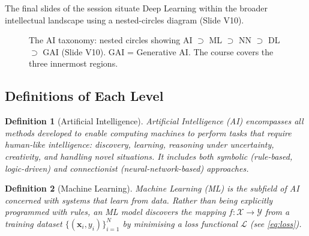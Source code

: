 \documentclass[12pt,a4paper]{article}
\newtheorem{definition}{Definition}[section]
\begin{document}
The final slides of the session situate Deep Learning within the broader
intellectual landscape using a nested-circles diagram (Slide V10).

\begin{figure}[ht]
\centering
{}
\caption{The AI taxonomy: nested circles showing AI $\supset$ ML $\supset$ NN
$\supset$ DL $\supset$ GAI (Slide V10).
GAI = Generative AI.  The course covers the three innermost regions.}
\label{fig:taxonomy}
\end{figure}

\subsection{Definitions of Each Level}
\label{subsec:level_definitions}

\begin{definition}[Artificial Intelligence]
\label{def:ai}
\emph{Artificial Intelligence} (AI) encompasses all methods developed to
enable computing machines to perform tasks that require human-like
intelligence: discovery, learning, reasoning under uncertainty, creativity,
and handling novel situations.  It includes both \emph{symbolic} (rule-based,
logic-driven) and \emph{connectionist} (neural-network-based) approaches.
\end{definition}

\begin{definition}[Machine Learning]
\label{def:ml}
\emph{Machine Learning} (ML) is the subfield of AI concerned with systems
that learn from data.  Rather than being explicitly programmed with rules, an
ML model discovers the mapping $f: \mathcal{X} \to \mathcal{Y}$ from a
training dataset $\{(\mathbf{x}_i, y_i)\}_{i=1}^N$ by minimising a loss
functional $\mathcal{L}$ (see \cref{eq:loss}).
\end{definition}
\end{document}
